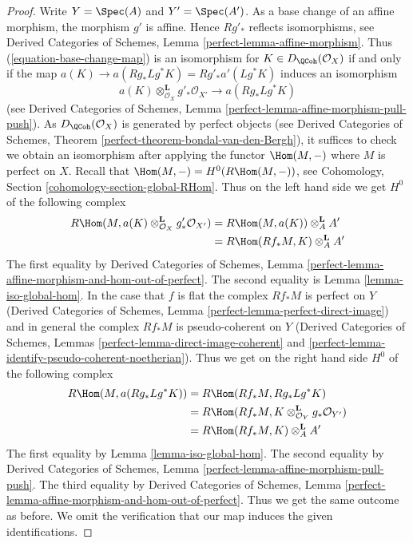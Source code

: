 \begin{proof}
Write $Y = \Spec(A)$ and $Y' = \Spec(A')$. As a base change of an affine
morphism, the morphism $g'$ is affine. Hence $Rg'_*$ reflects isomorphisms,
see Derived Categories of Schemes, Lemma \ref{perfect-lemma-affine-morphism}.
Thus (\ref{equation-base-change-map}) is an isomorphism for
$K \in D_\QCoh(\mathcal{O}_X)$ if and only
if the map $a(K) \to a(Rg_*Lg^*K) = Rg'_*a'(Lg^*K)$ induces an isomorphism
$$
a(K) \otimes^\mathbf{L}_{\mathcal{O}_X} g'_*\mathcal{O}_{X'} \to a(Rg_*Lg^*K)
$$
(see Derived Categories of Schemes, Lemma
\ref{perfect-lemma-affine-morphism-pull-push}).
As $D_\QCoh(\mathcal{O}_X)$ is generated by perfect objects
(see Derived Categories of Schemes, Theorem
\ref{perfect-theorem-bondal-van-den-Bergh}), it suffices
to check we obtain an isomorphism after applying the functor
$\Hom(M, -)$ where $M$ is perfect on $X$. Recall that
$\Hom(M, -) = H^0(R\Hom(M, -))$, see Cohomology, Section
\ref{cohomology-section-global-RHom}. Thus on the left hand side
we get $H^0$ of the following complex
\begin{align*}
R\Hom(M, a(K) \otimes^\mathbf{L}_{\mathcal{O}_X} g'_*\mathcal{O}_{X'})
& =
R\Hom(M, a(K)) \otimes^\mathbf{L}_A A' \\
& =
R\Hom(Rf_*M, K) \otimes^\mathbf{L}_A A'
\end{align*}
The first equality by Derived Categories of Schemes,
Lemma \ref{perfect-lemma-affine-morphism-and-hom-out-of-perfect}.
The second equality is Lemma \ref{lemma-iso-global-hom}.
In the case that $f$ is flat the complex $Rf_*M$ is perfect on $Y$
(Derived Categories of Schemes, Lemma \ref{perfect-lemma-perfect-direct-image})
and in general the complex $Rf_*M$ is pseudo-coherent on $Y$
(Derived Categories of Schemes, Lemmas
\ref{perfect-lemma-direct-image-coherent} and
\ref{perfect-lemma-identify-pseudo-coherent-noetherian}).
Thus we get on the right hand side $H^0$ of the following complex
\begin{align*}
R\Hom(M, a(Rg_*Lg^*K))
& =
R\Hom(Rf_*M, Rg_*Lg^*K) \\
& =
R\Hom(Rf_*M, K \otimes^\mathbf{L}_{\mathcal{O}_Y} g_*\mathcal{O}_{Y'}) \\
& =
R\Hom(Rf_*M, K) \otimes_A^\mathbf{L} A'
\end{align*}
The first equality by Lemma \ref{lemma-iso-global-hom}. The second equality
by Derived Categories of Schemes, Lemma
\ref{perfect-lemma-affine-morphism-pull-push}.
The third equality by Derived Categories of Schemes,
Lemma \ref{perfect-lemma-affine-morphism-and-hom-out-of-perfect}.
Thus we get the same outcome as before. We omit the
verification that our map induces the given identifications.
\end{proof}

